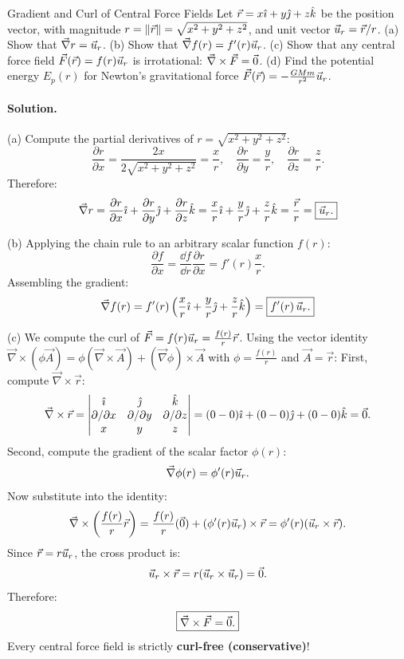 \begin{workedexample}{Gradient and Curl of Central Force Fields}
Let $\vec{r} = x\hat{\imath} + y\hat{\jmath} + z\hat{k}$ be the position vector, with magnitude $r = \left\lVert \vec{r} \right\rVert = \sqrt{x^2 + y^2 + z^2}$, and unit vector $\vec{u}_r = \vec{r}/r$.
(a) Show that $\vec{\nabla} r = \vec{u}_r$.
(b) Show that $\vec{\nabla} f(r) = f'(r)\vec{u}_r$.
(c) Show that any central force field $\vec{F}(\vec{r}) = f(r)\vec{u}_r$ is irrotational: $\vec{\nabla}\times\vec{F} = \vec{0}$.
(d) Find the potential energy $E_p(r)$ for Newton's gravitational force $\vec{F}(\vec{r}) = -\frac{GMm}{r^2}\vec{u}_r$.

\paragraph{Solution.}

(a) Compute the partial derivatives of $r = \sqrt{x^2 + y^2 + z^2}$:
\[
\frac{\partial r}{\partial x} = \frac{2x}{2\sqrt{x^2 + y^2 + z^2}} = \frac{x}{r}, \quad \frac{\partial r}{\partial y} = \frac{y}{r}, \quad \frac{\partial r}{\partial z} = \frac{z}{r}.
\]
Therefore:
\[
\vec{\nabla} r = \frac{\partial r}{\partial x}\hat{\imath} + \frac{\partial r}{\partial y}\hat{\jmath} + \frac{\partial r}{\partial z}\hat{k} = \frac{x}{r}\hat{\imath} + \frac{y}{r}\hat{\jmath} + \frac{z}{r}\hat{k} = \frac{\vec{r}}{r} = \boxed{\vec{u}_r.}
\]

(b) Applying the chain rule to an arbitrary scalar function $f(r)$:
\[
\frac{\partial f}{\partial x} = \frac{\dd f}{\dd r}\frac{\partial r}{\partial x} = f'(r)\frac{x}{r}.
\]
Assembling the gradient:
\[
\vec{\nabla} f(r) = f'(r)\left(\frac{x}{r}\hat{\imath} + \frac{y}{r}\hat{\jmath} + \frac{z}{r}\hat{k}\right) = \boxed{f'(r)\,\vec{u}_r.}
\]

(c) We compute the curl of $\vec{F} = f(r)\vec{u}_r = \frac{f(r)}{r}\vec{r}$.
Using the vector identity $\vec{\nabla}\times(\phi\vec{A}) = \phi(\vec{\nabla}\times\vec{A}) + (\vec{\nabla}\phi)\times\vec{A}$ with $\phi = \frac{f(r)}{r}$ and $\vec{A} = \vec{r}$:
First, compute $\vec{\nabla}\times\vec{r}$:
\[
\vec{\nabla}\times\vec{r} = \begin{vmatrix} \hat{\imath} & \hat{\jmath} & \hat{k} \\ \partial/\partial x & \partial/\partial y & \partial/\partial z \\ x & y & z \end{vmatrix} = (0 - 0)\hat{\imath} + (0 - 0)\hat{\jmath} + (0 - 0)\hat{k} = \vec{0}.
\]
Second, compute the gradient of the scalar factor $\phi(r)$:
\[
\vec{\nabla}\phi(r) = \phi'(r)\vec{u}_r.
\]
Now substitute into the identity:
\[
\vec{\nabla}\times\left( \frac{f(r)}{r}\vec{r} \right) = \frac{f(r)}{r}(\vec{0}) + \left( \phi'(r)\vec{u}_r \right)\times\vec{r} = \phi'(r)(\vec{u}_r\times\vec{r}).
\]
Since $\vec{r} = r\vec{u}_r$, the cross product is:
\[
\vec{u}_r\times\vec{r} = r(\vec{u}_r\times\vec{u}_r) = \vec{0}.
\]
Therefore:
\[
\boxed{\vec{\nabla}\times\vec{F} = \vec{0}.}
\]
Every central force field is strictly \textbf{curl-free (conservative)}!


\end{workedexample}
